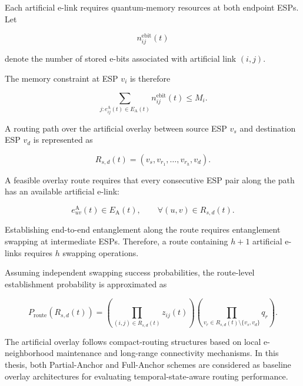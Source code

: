 Each artificial e-link requires quantum-memory resources at both endpoint ESPs. Let

\begin{equation}
    n_{ij}^{\mathrm{ebit}}(t)
\end{equation}

denote the number of stored e-bits associated with artificial link $(i,j)$.

The memory constraint at ESP $v_i$ is therefore

\begin{equation}
    \sum_{j:
    e_{ij}^{\mathrm{A}}(t)
    \in
    E_{\mathrm{A}}(t)}
    n_{ij}^{\mathrm{ebit}}(t)
    \leq
    M_i .
\end{equation}

A routing path over the artificial overlay between source ESP $v_s$ and destination ESP $v_d$ is represented as

\begin{equation}
    R_{s,d}(t)
    =
    \left(
    v_s,
    v_{r_1},
    \ldots,
    v_{r_h},
    v_d
    \right).
\end{equation}

A feasible overlay route requires that every consecutive ESP pair along the path has an available artificial e-link:

\begin{equation}
    e_{uv}^{\mathrm{A}}(t)
    \in
    E_{\mathrm{A}}(t),
    \qquad
    \forall (u,v)\in R_{s,d}(t).
\end{equation}

Establishing end-to-end entanglement along the route requires entanglement swapping at intermediate ESPs. Therefore, a route containing $h+1$ artificial e-links requires $h$ swapping operations.

Assuming independent swapping success probabilities, the route-level establishment probability is approximated as

\begin{equation}
    P_{\mathrm{route}}
    \left(
    R_{s,d}(t)
    \right)
    =
    \left(
    \prod_{(i,j)\in R_{s,d}(t)}
    z_{ij}(t)
    \right)
    \left(
    \prod_{v_r\in R_{s,d}(t)\setminus\{v_s,v_d\}}
    q_r
    \right).
\end{equation}

The artificial overlay follows compact-routing structures based on local e-neighborhood maintenance and long-range connectivity mechanisms. In this thesis, both Partial-Anchor and Full-Anchor schemes are considered as baseline overlay architectures for evaluating temporal-state-aware routing performance.

